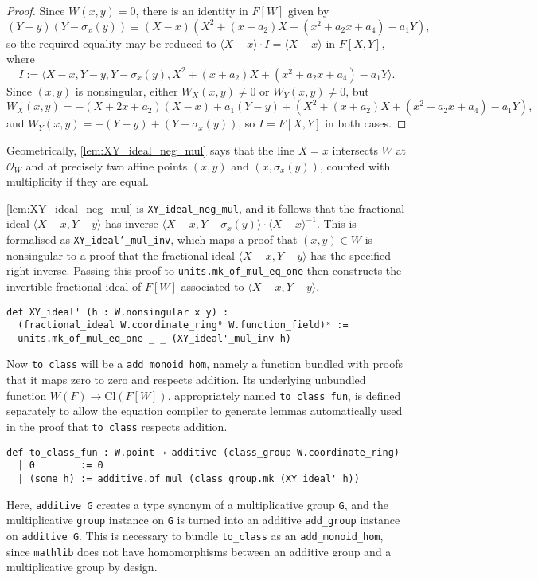 \documentclass[a4paper,UKenglish,cleveref,autoref,thm-restate]{lipics-v2021}
\begin{document}
\begin{proof}
Since $ W(x, y) = 0 $, there is an identity in $ F[W] $ given by
\[ (Y - y)(Y - \sigma_x(y)) \equiv (X - x)(X^2 + (x + a_2)X + (x^2 + a_2x + a_4) - a_1Y), \]
so the required equality may be reduced to $ \langle X - x \rangle \cdot I = \langle X - x \rangle $ in $ F[X, Y] $, where
\[ I := \langle X - x, Y - y, Y - \sigma_x(y), X^2 + (x + a_2)X + (x^2 + a_2x + a_4) - a_1Y \rangle. \]
Since $ (x, y) $ is nonsingular, either $ W_X(x, y) \ne 0 $ or $ W_Y(x, y) \ne 0 $, but
\[ W_X(x, y) = - (X + 2x + a_2)(X - x) + a_1(Y - y) + (X^2 + (x + a_2)X + (x^2 + a_2x + a_4) - a_1Y), \]
and $ W_Y(x, y) = -(Y - y) + (Y - \sigma_x(y)) $, so $ I = F[X, Y] $ in both cases.
\end{proof}

\begin{remark}
Geometrically, \cref{lem:XY_ideal_neg_mul} says that the line $ X = x $ intersects $ W $ at $ \mathcal{O}_W $ and at precisely two affine points $ (x, y) $ and $ (x, \sigma_x(y)) $, counted with multiplicity if they are equal.
\end{remark}

\cref{lem:XY_ideal_neg_mul} is \texttt{XY\_ideal\_neg\_mul}, and it follows that the fractional ideal $ \langle X - x, Y - y \rangle $ has inverse $ \langle X - x, Y - \sigma_x(y) \rangle \cdot \langle X - x \rangle^{-1} $. This is formalised as \texttt{XY\_ideal'\_mul\_inv}, which maps a proof that $ (x, y) \in W $ is nonsingular to a proof that the fractional ideal $ \langle X - x, Y - y \rangle $ has the specified right inverse. Passing this proof to \texttt{units.mk\_of\_mul\_eq\_one} then constructs the invertible fractional ideal of $ F[W] $ associated to $ \langle X - x, Y - y \rangle $.
\begin{lstlisting}
def XY_ideal' (h : W.nonsingular x y) :
  (fractional_ideal W.coordinate_ring⁰ W.function_field)ˣ :=
  units.mk_of_mul_eq_one _ _ (XY_ideal'_mul_inv h)
\end{lstlisting}

Now \texttt{to\_class} will be a \texttt{add\_monoid\_hom}, namely a function bundled with proofs that it maps zero to zero and respects addition. Its underlying unbundled function $ W(F) \to \mathrm{Cl}(F[W]) $, appropriately named \texttt{to\_class\_fun}, is defined separately to allow the equation compiler to generate lemmas automatically used in the proof that \texttt{to\_class} respects addition.
\begin{lstlisting}
def to_class_fun : W.point → additive (class_group W.coordinate_ring)
  | 0        := 0
  | (some h) := additive.of_mul (class_group.mk (XY_ideal' h))
\end{lstlisting}
Here, \texttt{additive G} creates a type synonym of a multiplicative group \texttt{G}, and the multiplicative \texttt{group} instance on \texttt{G} is turned into an additive \texttt{add\_group} instance on \texttt{additive G}. This is necessary to bundle \texttt{to\_class} as an \texttt{add\_monoid\_hom}, since \texttt{mathlib} does not have homomorphisms between an additive group and a multiplicative group by design.
\end{document}
